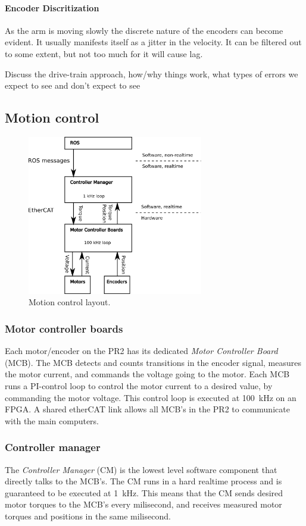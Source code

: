 \paragraph{Encoder Discritization}
As the arm is moving slowly the discrete nature of the encoders can
become evident.  It usually manifests itself as a jitter in the
velocity.  It can be filtered out to some extent, but not too much for
it will cause lag.



Discuss the drive-train approach, how/why things work, what types of errors we expect to see and don't expect to see

\subsection{Motion control}


\begin{figure}[h]
\centering
\includegraphics[width=290px]{images/mechanism_control.png}
\caption{Motion control layout.}
\label{fig:motion_control}
\end{figure}


\subsubsection{Motor controller boards}
Each motor/encoder on the PR2 has its dedicated \emph{Motor Controller
  Board} (MCB). The MCB detects and counts transitions in the encoder
signal, measures the motor current, and commands the
voltage going to the motor. Each MCB runs a PI-control loop to control
the motor current to a desired value, by commanding the motor
voltage. This control loop is executed at 100~kHz on an FPGA.  A
shared etherCAT link allows all MCB's in the PR2 to communicate with
the main computers.

\subsubsection{Controller manager}
The \emph{Controller Manager} (CM) is the lowest level software
component that directly talks to the MCB's. The CM runs in a hard
realtime process and is guaranteed to be executed at 1~kHz. This means that
the CM sends desired motor torques to the MCB's every milisecond, and
receives measured motor torques and positions in the same milisecond.

